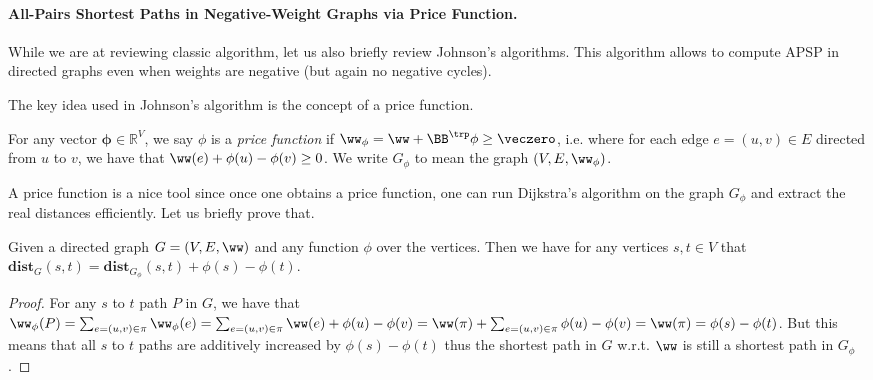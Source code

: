 

\paragraph{All-Pairs Shortest Paths in Negative-Weight Graphs via Price Function.} While we are at reviewing classic algorithm, let us also briefly review Johnson's algorithms. This algorithm allows to compute APSP in directed graphs even when weights are negative (but again no negative cycles).

The key idea used in Johnson's algorithm is the concept of a price function.

\begin{definition}
For any vector $\mathbf{\phi} \in \mathbb{R}^V$, we say $\phi$ is a \emph{price function} if $\ww_{\mathbf{\phi}} = \ww + \BB^{\trp} \mathbf{\phi} \geq \veczero$, i.e. where for each edge $e = (u,v) \in E$ directed from $u$ to $v$, we have that $\ww(e) + \phi(u) - \phi(v) \geq 0$. We write $G_{\phi}$ to mean the graph $(V, E, \ww_{\phi})$. %
\end{definition}

A price function is a nice tool since once one obtains a price function, one can run Dijkstra's algorithm on the graph $G_{\phi}$ and extract the real distances efficiently. Let us briefly prove that.

\begin{claim}
Given a directed graph $G = (V,E, \ww)$ and any function $\phi$ over the vertices. Then we have for any vertices $s,t \in V$ that $\mathbf{dist}_{G}(s,t) = \mathbf{dist}_{G_{\phi}}(s, t) + \phi(s) - \phi(t)$.  
\end{claim}
\begin{proof}
For any $s$ to $t$ path $P$ in $G$, we have that $\ww_{\phi}(P) = \sum_{e = (u,v) \in \pi} \ww_{\phi}(e) =  \sum_{e = (u,v) \in \pi}  \ww(e) + \phi(u) - \phi(v) = \ww(\pi) + \sum_{e = (u,v) \in \pi}  \phi(u) - \phi(v) = \ww(\pi) = \phi(s) - \phi(t)$. But this means that all $s$ to $t$ paths are additively increased by $\phi(s) - \phi(t)$ thus the shortest path in $G$ w.r.t. $\ww$ is still a shortest path in $G_{\phi}$. 
\end{proof}

